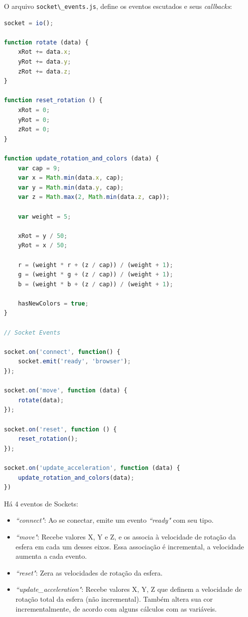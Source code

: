 \documentclass[a4paper,12pt]{article}
\newcommand{\code}[1]{\lstinline[mathescape=true, columns=fixed, basicstyle={\small\ttfamily}]{#1}}
\begin{document}
O arquivo \code{socket\_events.js}, define os eventos escutados e seus \emph{callbacks}:


\begin{lstlisting}[language=JavaScript]
socket = io();

function rotate (data) {
    xRot += data.x;
    yRot += data.y;
    zRot += data.z;
}

function reset_rotation () {
    xRot = 0;
    yRot = 0;
    zRot = 0;
}

function update_rotation_and_colors (data) {
    var cap = 9;
    var x = Math.min(data.x, cap);
    var y = Math.min(data.y, cap);
    var z = Math.max(2, Math.min(data.z, cap));

    var weight = 5;

    xRot = y / 50;
    yRot = x / 50;

    r = (weight * r + (z / cap)) / (weight + 1);
    g = (weight * g + (z / cap)) / (weight + 1);
    b = (weight * b + (z / cap)) / (weight + 1);

    hasNewColors = true;
}

// Socket Events

socket.on('connect', function() {
    socket.emit('ready', 'browser');
});

socket.on('move', function (data) {
    rotate(data);
});

socket.on('reset', function () {
    reset_rotation();
});

socket.on('update_acceleration', function (data) {
    update_rotation_and_colors(data);
})
\end{lstlisting}

Há 4 eventos de Sockets:

\begin{itemize}

  \item \emph{“connect"}: Ao se conectar, emite um evento \emph{“ready"} com seu tipo.

  \item \emph{“move"}: Recebe valores X, Y e Z, e os associa à velocidade de rotação da esfera em cada um desses eixos. Essa associação é incremental, a velocidade aumenta a cada evento.

  \item \emph{“reset"}: Zera as velocidades de rotação da esfera.

  \item \emph{“update\_acceleration"}: Recebe valores X, Y, Z que definem a velocidade de rotação total da esfera (não incremental). Também altera sua cor incrementalmente, de acordo com alguns cálculos com as variáveis.

\end{itemize}
\end{document}
